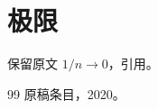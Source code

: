 \documentclass[UTF8,fontset=fandol]{ctexart}
\begin{document}
\section{极限}
\begin{mdframed}[style=sample]
保留原文 $1/n\to0$，引用\cite{ExactBook}。
\end{mdframed}

\begin{thebibliography}{99}
 原稿条目，2020。
\end{thebibliography}
\end{document}
